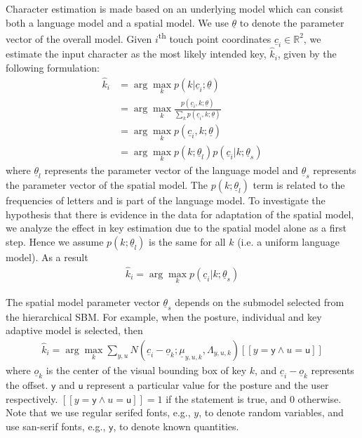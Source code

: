 \documentclass{sigchi}
\begin{document}
Character estimation is made based on an underlying model which can consist
both a language model and a spatial model.
We use $\underline\theta$ to denote the parameter vector of the overall model. Given
$i$\textsuperscript{th} touch point coordinates $\underline c_i \in \mathbb{R}^2$, we estimate the input character as the most likely intended key, $\hat k_i$,  given by the following formulation:
\begin{align}
\hat k_i &= \arg\max_k p(k | \underline c_i; \underline \theta) \\
          &= \arg\max_k \frac{p(\underline c_i, k; \underline \theta)}{\sum_k p(\underline c_i, k; \underline \theta)} \\
          &= \arg\max_k p(\underline c_i, k; \underline \theta) \\
          &= \arg\max_k p(k;\underline\theta_l)p(\underline c_i | k; \underline \theta_s) \label{eq:likely-k}
\end{align}
where $\underline\theta_l$ represents the parameter vector of the language model and $\underline\theta_s$ represents the parameter vector of the spatial model. The $p(k;\underline\theta_l)$ term is related to the frequencies of letters and is part of the language model. To investigate the hypothesis that there is evidence in the data for adaptation of the spatial model, we analyze the effect in key estimation due to the spatial model alone as a first step. Hence we assume $p(k; \underline\theta_l)$ is the same for all $k$ (i.e. a uniform language model). As a result
\begin{align}
\hat k_i = \arg\max_k p(\underline c_i | k; \underline \theta_s)
\end{align}

The spatial model parameter vector $\underline \theta_s$ depends on the submodel
selected from the hierarchical SBM. For example, when the posture, individual and key adaptive model is selected, then
\begin{align}          
\hat k_i = \arg\max_k \sum_{y, u} N(\underline c_i - \underline o_k; \underline\mu_{y,u,k}, \Lambda_{y,u,k})[[y = \textsf{y} \wedge u = \textsf{u}]]
\end{align}
where $\underline o_k$ is the center of the visual bounding box of key $k$, and $\underline c_i - \underline o_k$ 
represents the offset. $\textsf{y}$ and $\textsf{u}$ represent a particular value for the posture 
and the user respectively. $[[y = \textsf{y} \wedge u = \textsf{u}]] = 1$ if the 
statement is true, and $0$ otherwise. Note that we use regular serifed fonts,
e.g., $y$, to denote random variables, and use san-serif fonts, e.g.,
$\textsf{y}$, to denote known quantities.
\end{document}
